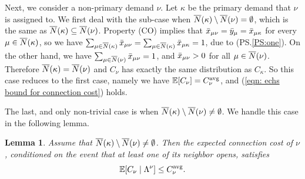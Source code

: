 \documentclass[oneside,final]{ucr}
\newtheorem{lemma}[theorem]{Lemma}
\begin{document}
Next, we consider a non-primary demand $\nu$. Let $\kappa$
be the primary demand that $\nu$ is assigned to. We first
deal with the sub-case when ${\overline{N}}(\kappa)\setminus
{\overline{N}}(\nu) = \emptyset$, which is the same as
${\overline{N}}(\kappa) \subseteq {\overline{N}}(\nu)$. Property (CO)
implies that ${\bar x}_{\mu\nu} = {\bar y}_{\mu} =
{\bar x}_{\mu\kappa}$ for every $\mu \in {\overline{N}}(\kappa)$, so we
have $\sum_{\mu\in{\overline{N}}(\kappa)} {\bar x}_{\mu\nu} =
\sum_{\mu\in{\overline{N}}(\kappa)} {\bar x}_{\mu\kappa} = 1$, due to
(PS.\ref{PS:one}). On the other hand, we have
$\sum_{\mu\in{\overline{N}}(\nu)} {\bar x}_{\mu\nu} = 1$, and
${\bar x}_{\mu\nu} > 0$ for all $\mu\in {\overline{N}}(\nu)$. Therefore
${\overline{N}}(\kappa) = {\overline{N}}(\nu)$ and $C_\nu$ has exactly the
same distribution as $C_\kappa$.  So this case reduces to
the first case, namely we have $\mathbb{E}[C_{\nu}] =
C^{{\mbox{\scriptsize\rm avg}}}_{\nu}$, and (\ref{eqn: echs bound for connection
  cost}) holds.

The last, and only non-trivial case is when ${\overline{N}}(\kappa)\setminus
{\overline{N}}(\nu)\neq\emptyset$. We handle this case in the following lemma.


\begin{lemma}\label{lem: echs expected C_nu}
Assume that ${\overline{N}}(\kappa) \setminus {\overline{N}}(\nu) \neq \emptyset$.
Then the expected connection cost of $\nu$, conditioned on the event that at least one of 
its neighbor opens, satisfies
%
\begin{equation*}
  \mathbb{E}[C_\nu \mid \Lambda^\nu] \leq C^{{\mbox{\scriptsize\rm avg}}}_{\nu}.
\end{equation*}
\end{lemma}
\end{document}
